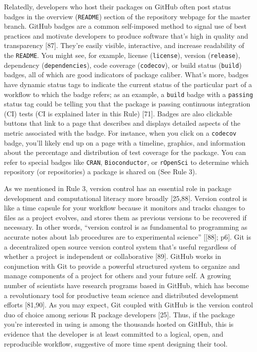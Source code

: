 \documentclass[10pt,letterpaper]{article}
\begin{document}
Relatedly, developers who host their packages on GitHub often post
status badges in the overview (\texttt{README}) section of the
repository webpage for the master branch. GitHub badges are a common
self-imposed method to signal use of best practices and motivate
developers to produce software that's high in quality and transparency
{[}87{]}. They're easily visible, interactive, and increase readability
of the \texttt{README}. You might see, for example, license
(\texttt{license}), version (\texttt{release}), dependency
(\texttt{dependencies}), code coverage (\texttt{codecov}), or build
status (\texttt{build}) badges, all of which are good indicators of
package caliber. What's more, badges have dynamic status tags to
indicate the current status of the particular part of a workflow to
which the badge refers; as an example, a \texttt{build} badge with a
\texttt{passing} status tag could be telling you that the package is
passing continuous integration (CI) tests (CI is explained later in this
Rule) {[}71{]}. Badges are also clickable buttons that link to a page
that describes and displays detailed aspects of the metric associated
with the badge. For instance, when you click on a \texttt{codecov}
badge, you'll likely end up on a page with a timeline, graphics, and
information about the percentage and distribution of test coverage for
the package. You can refer to special badges like \texttt{CRAN},
\texttt{Bioconductor}, or \texttt{rOpenSci} to determine which
repository (or repositories) a package is shared on (See Rule 3).

As we mentioned in Rule 3, version control has an essential role in
package development and computational literacy more broadly {[}25,88{]}.
Version control is like a time capsule for your workflow because it
monitors and tracks changes to files as a project evolves, and stores
them as previous versions to be recovered if necessary. In other words,
``version control is as fundamental to programming as accurate notes
about lab procedures are to experimental science'' {[}{[}88{]}; p6{]}.
Git is a decentralized open source version control system that's useful
regardless of whether a project is independent or collaborative
{[}89{]}. GitHub works in conjunction with Git to provide a powerful
structured system to organize and manage components of a project for
others and your future self. A growing number of scientists have
research programs based in GitHub, which has become a revolutionary tool
for productive team science and distributed development efforts
{[}81,90{]}. As you may expect, Git coupled with GitHub is the version
control duo of choice among serious R package developers {[}25{]}. Thus,
if the package you're interested in using is among the thousands hosted
on GitHub, this is evidence that the developer is at least committed to
a logical, open, and reproducible workflow, suggestive of more time
spent designing their tool.
\end{document}
